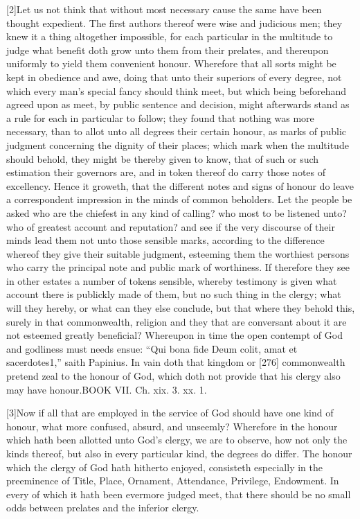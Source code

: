 [2]Let us not think that without most necessary cause the same have been thought expedient. The first authors thereof were wise and judicious men; they knew it a thing altogether impossible, for each particular in the multitude to judge what benefit doth grow unto them from their prelates, and thereupon uniformly to yield them convenient honour. Wherefore that all sorts might be kept in obedience and awe, doing that unto their superiors of every degree, not which every man’s special fancy should think meet, but which being beforehand agreed upon as meet, by public sentence and decision, might afterwards stand as a rule for each in particular to follow; they found that nothing was more necessary, than to allot unto all degrees their certain honour, as marks of public judgment concerning the dignity of their places; which mark when the multitude should behold, they might be thereby given to know, that of such or such estimation their governors are, and in token thereof do carry those notes of excellency. Hence it groweth, that the different notes and signs of honour do leave a correspondent impression in the minds of common beholders. Let the people be asked who are the chiefest in any kind of calling? who most to be listened unto? who of greatest account and reputation? and see if the very discourse of their minds lead them not unto those sensible marks, according to the difference whereof they give their suitable judgment, esteeming them the worthiest persons who carry the principal note and public mark of worthiness. If therefore they see in other estates a number of tokens sensible, whereby testimony is given what account there is publickly made of them, but no such thing in the clergy; what will they hereby, or what can they else conclude, but that where they behold this, surely in that commonwealth, religion and they that are conversant about it are not esteemed greatly beneficial? Whereupon in time the open contempt of God and godliness must needs ensue: “Qui bona fide Deum colit, amat et sacerdotes1,” saith Papinius. In vain doth that kingdom or [276] commonwealth pretend zeal to the honour of God, which doth not provide that his clergy also may have honour.BOOK VII. Ch. xix. 3. xx. 1.

[3]Now if all that are employed in the service of God should have one kind of honour, what more confused, absurd, and unseemly? Wherefore in the honour which hath been allotted unto God’s clergy, we are to observe, how not only the kinds thereof, but also in every particular kind, the degrees do differ. The honour which the clergy of God hath hitherto enjoyed, consisteth especially in the preeminence of Title, Place, Ornament, Attendance, Privilege, Endowment. In every of which it hath been evermore judged meet, that there should be no small odds between prelates and the inferior clergy.

